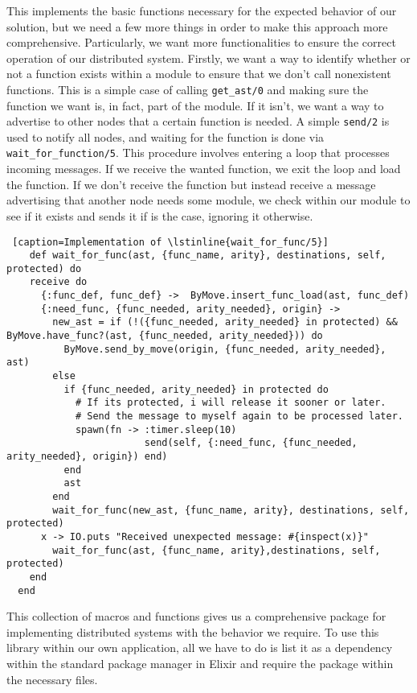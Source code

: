 This implements the basic functions necessary for the expected behavior of our solution, but we need a few more things in order to make this approach more comprehensive. Particularly, we want more functionalities to ensure the correct operation of our distributed system. Firstly, we want a way to identify whether or not a function exists within a module to ensure that we don't call nonexistent functions. This is a simple case of calling \lstinline{get_ast/0} and making sure the function we want is, in fact, part of the module. If it isn't, we want a way to advertise to other nodes that a certain function is needed. A simple \lstinline{send/2} is used to notify all nodes, and waiting for the function is done via \lstinline{wait_for_function/5}. This procedure involves entering a loop that processes incoming messages. If we receive the wanted function, we exit the loop and load the function. If we don't receive the function but instead receive a message advertising that another node needs some module, we check within our module to see if it exists and sends it if is the case, ignoring it otherwise. 

\begin{lstlisting} [caption=Implementation of \lstinline{wait_for_func/5}]
    def wait_for_func(ast, {func_name, arity}, destinations, self, protected) do
    receive do
      {:func_def, func_def} ->  ByMove.insert_func_load(ast, func_def)
      {:need_func, {func_needed, arity_needed}, origin} ->
        new_ast = if (!({func_needed, arity_needed} in protected) && ByMove.have_func?(ast, {func_needed, arity_needed})) do
          ByMove.send_by_move(origin, {func_needed, arity_needed}, ast)
        else
          if {func_needed, arity_needed} in protected do
            # If its protected, i will release it sooner or later. 
            # Send the message to myself again to be processed later.
            spawn(fn -> :timer.sleep(10)
                        send(self, {:need_func, {func_needed, arity_needed}, origin}) end)
          end
          ast
        end
        wait_for_func(new_ast, {func_name, arity}, destinations, self, protected)
      x -> IO.puts "Received unexpected message: #{inspect(x)}"
        wait_for_func(ast, {func_name, arity},destinations, self, protected)
    end
  end
\end{lstlisting}


This collection of macros and functions gives us a comprehensive package for implementing distributed systems with the behavior we require. To use this library within our own application, all we have to do is list it as a dependency within the standard package manager in Elixir and require the package within the necessary files.